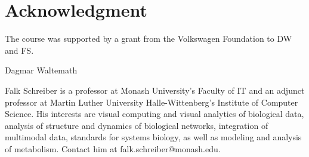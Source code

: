 \documentclass[journal,transmag]{IEEEtran}
\begin{document}
\section*{Acknowledgment}
The course was supported by a grant from the Volkswagen Foundation to DW and FS. 

\ifCLASSOPTIONcaptionsoff
  \newpage
\fi




% 

\begin{IEEEbiography}{Dagmar Waltemath}
\end{IEEEbiography}

\begin{IEEEbiography}{Falk Schreiber}
 is a professor at Monash University's Faculty of IT and an adjunct professor at Martin Luther University Halle-Wittenberg's Institute of Computer Science. His interests are visual computing and visual analytics of biological data, analysis of structure and dynamics of biological networks, integration of multimodal data, standards for systems biology, as well as modeling and analysis of metabolism.
Contact him at falk.schreiber@monash.edu.
\end{IEEEbiography}
\end{document}
